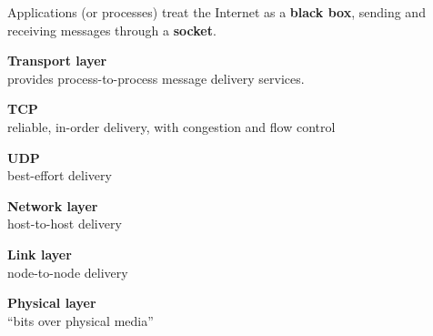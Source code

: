 \documentclass[20pt,handout,notes=show]{beamer}
\begin{document}
\begin{frame}\begin{center}\large
Applications (or processes) treat the Internet as a \textbf{black box}, sending and receiving messages through a \textbf{socket}.
\end{center}\end{frame}

\begin{frame}\begin{center}\large
\textbf{Transport layer}\\\large provides process-to-process message delivery services.
\end{center}\end{frame}

\begin{frame}\begin{center}\large
\textbf{TCP}\\
\large reliable, in-order delivery, with congestion and flow control
\end{center}\end{frame}

\begin{frame}\begin{center}\large
\textbf{UDP}\\
\large best-effort delivery
\end{center}\end{frame}

\begin{frame}\begin{center}\large
\textbf{Network layer}\\ 
\large host-to-host delivery 
\end{center}\end{frame}

\begin{frame}\begin{center}\large\textbf{Link layer}\\ 
\large node-to-node delivery 
\end{center}\end{frame}

\begin{frame}\begin{center}\large
\textbf{Physical layer}\\\large ``bits over physical media'' 
\end{center}\end{frame}
\end{document}
